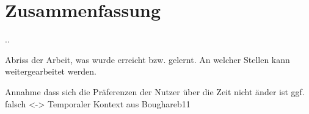 
\section{Zusammenfassung}\newpage.\newpage\newpage.\newpage\newpage

	Abriss der Arbeit, was wurde erreicht bzw. gelernt. An welcher Stellen kann weitergearbeitet werden. 


Annahme dass sich die Präferenzen der Nutzer über die Zeit nicht änder ist ggf. falsch <-> Temporaler Kontext aus Boughareb11 
